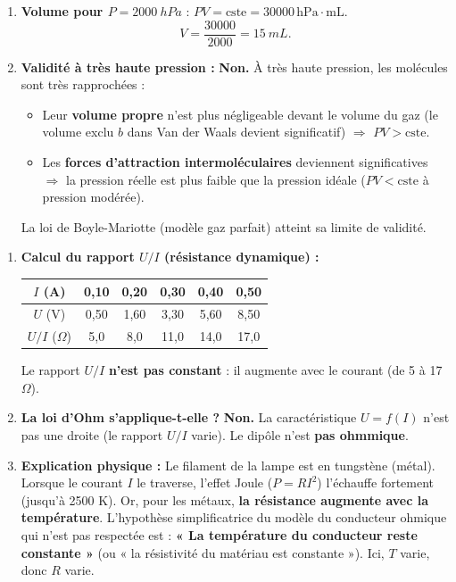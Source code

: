 \documentclass[11pt]{article}
\begin{document}
\begin{corrige}
\begin{enumerate}
\item \textbf{Volume pour $P = \SI{2000}{hPa}$} :
      $P V = \text{cste} = 30000\,\mathrm{hPa\cdot mL}$.
      \[
      V = \frac{30000}{2000} = \SI{15}{mL}.
      \]
\item \textbf{Validité à très haute pression :} \textbf{Non.} À très haute pression, les molécules sont très rapprochées :
      \begin{itemize}
      \item Leur \textbf{volume propre} n'est plus négligeable devant le volume du gaz (le volume exclu $b$ dans Van der Waals devient significatif) $\Rightarrow$ $PV > \text{cste}$.
      \item Les \textbf{forces d'attraction intermoléculaires} deviennent significatives $\Rightarrow$ la pression réelle est plus faible que la pression idéale ($PV < \text{cste}$ à pression modérée).
      \end{itemize}
      La loi de Boyle-Mariotte (modèle gaz parfait) atteint sa limite de validité.
\end{enumerate}
\end{corrige}

\begin{corrige}
\begin{enumerate}
\item \textbf{Calcul du rapport $U/I$ (résistance dynamique) :}
      \begin{center}
      \begin{tabular}{|c|c|c|c|c|c|}\hline
      $I$ (A) & 0,10 & 0,20 & 0,30 & 0,40 & 0,50 \\ \hline
      $U$ (V) & 0,50 & 1,60 & 3,30 & 5,60 & 8,50 \\ \hline
      $U/I$ ($\Omega$) & 5,0 & 8,0 & 11,0 & 14,0 & 17,0 \\ \hline
      \end{tabular}
      \end{center}
      Le rapport $U/I$ \textbf{n'est pas constant} : il augmente avec le courant (de 5 à 17 $\Omega$).
\item \textbf{La loi d'Ohm s'applique-t-elle ?} \textbf{Non.} La caractéristique $U=f(I)$ n'est pas une droite (le rapport $U/I$ varie). Le dipôle n'est \textbf{pas ohmmique}.
\item \textbf{Explication physique :} Le filament de la lampe est en tungstène (métal). Lorsque le courant $I$ le traverse, l'effet Joule ($P = R I^2$) l'échauffe fortement (jusqu'à 2500 K). Or, pour les métaux, \textbf{la résistance augmente avec la température}. L'hypothèse simplificatrice du modèle du conducteur ohmique qui n'est pas respectée est : \textbf{« La température du conducteur reste constante »} (ou « la résistivité du matériau est constante »). Ici, $T$ varie, donc $R$ varie.
\end{enumerate}
\end{corrige}
\end{document}
